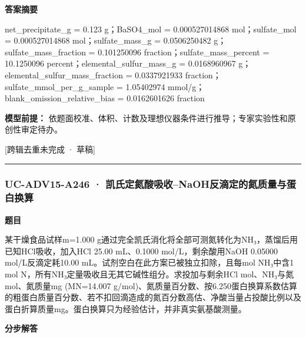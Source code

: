 \documentclass[UTF8,11pt,a4paper]{ctexart}
\begin{document}
\noindent\textbf{答案摘要}\par
net\_precipitate\_g = 0.123 g；BaSO4\_mol = 0.000527014868 mol；sulfate\_mol = 0.000527014868 mol；sulfate\_mass\_g = 0.0506250482 g；sulfate\_mass\_fraction = 0.101250096 fraction；sulfate\_mass\_percent = 10.1250096 percent；elemental\_sulfur\_mass\_g = 0.0168960967 g；elemental\_sulfur\_mass\_fraction = 0.0337921933 fraction；sulfate\_mmol\_per\_g\_sample = 1.05402974 mmol/g；blank\_omission\_relative\_bias = 0.0162601626 fraction\par
\noindent\textbf{模型前提：}
依题面校准、体积、计数及理想仪器条件进行推导；专家实验性和原创性审定待办。\par
\noindent\textcolor{red!65!black}{[跨辑去重未完成 · 草稿]} \par
\medskip\hrule\medskip
{}
\subsubsection*{UC-ADV15-A246 · 凯氏定氮酸吸收–NaOH反滴定的氮质量与蛋白换算}
\noindent\textbf{题目}\par
某干燥食品试样m=1.000 g通过完全凯氏消化将全部可测氮转化为NH₃，蒸馏后用已知HCl吸收，加入HCl 25.00 mL、0.1000 mol/L，剩余酸用NaOH 0.05000 mol/L反滴定耗10.00 mL。试剂空白在此方案已被独立扣除，且每mol NH₃中含1 mol N，所有NH₃定量吸收且无其它碱性组分。求投加与剩余HCl mol、NH₃与氮mol、氮质量mg (MN=14.007 g/mol)、氮质量百分数、按6.250蛋白换算系数估算的粗蛋白质量百分数、若不扣回滴造成的氮百分数高估、净酸当量占投酸比例以及蛋白折算质量mg。蛋白换算只为经验估计，并非真实氨基酸测量。\par
\medskip\noindent\textbf{分步解答}
\end{document}

